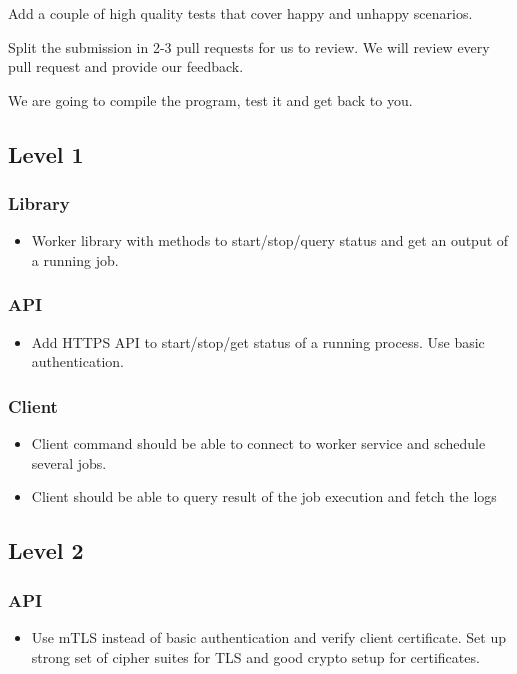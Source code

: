 \documentclass{article}
\begin{document}
  Add a couple of high quality tests that cover happy and unhappy scenarios.

  Split the submission in 2-3 pull requests for us to review. We will review every pull request and provide our feedback.

  We are going to compile the program, test it and get back to you.
  
  \subsection*{Level 1}

  \subsubsection*{Library}
  \begin{itemize} 
  \item[] Worker library with methods to start/stop/query status and get an output of a running job.
  \end{itemize}

  \subsubsection*{API}
  \begin{itemize} 
  \item[] Add HTTPS API to start/stop/get status of a running process. Use basic authentication.
  \end{itemize}

  \subsubsection*{Client}
  \begin{itemize} 
  \item[] Client command should be able to connect to worker service and schedule several jobs.
  \item[] Client should be able to query result of the job execution and fetch the logs
  \end{itemize}    
    
 \subsection*{Level 2}

 \subsubsection*{API}
 \begin{itemize} 
 \item[] Use mTLS instead of basic authentication and verify client certificate. Set up strong set of cipher suites for TLS and good crypto setup for certificates.
 \end{itemize}
\end{document}
